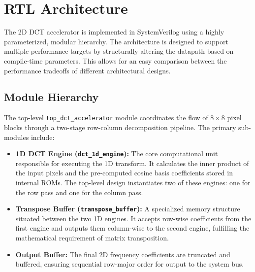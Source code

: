 \section{RTL Architecture}

The 2D DCT accelerator is implemented in SystemVerilog using a highly parameterized, modular hierarchy. The architecture is designed to support multiple performance targets by structurally altering the datapath based on compile-time parameters. This allows for an easy comparison between the performance tradeoffs of different architectural designs.

\subsection{Module Hierarchy}
The top-level \texttt{top\_dct\_accelerator} module coordinates the flow of $8 \times 8$ pixel blocks through a two-stage row-column decomposition pipeline. The primary sub-modules include:
\begin{itemize}
    \item \textbf{1D DCT Engine (\texttt{dct\_1d\_engine}):} The core computational unit responsible for executing the 1D transform. It calculates the inner product of the input pixels and the pre-computed cosine basis coefficients stored in internal ROMs. The top-level design instantiates two of these engines: one for the row pass and one for the column pass.
    \item \textbf{Transpose Buffer (\texttt{transpose\_buffer}):} A specialized memory structure situated between the two 1D engines. It accepts row-wise coefficients from the first engine and outputs them column-wise to the second engine, fulfilling the mathematical requirement of matrix transposition.
    \item \textbf{Output Buffer:} The final 2D frequency coefficients are truncated and buffered, ensuring sequential row-major order for output to the system bus.
\end{itemize}

